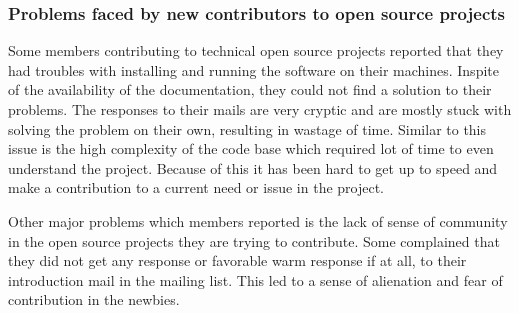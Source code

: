 \subsubsection {\bold Problems faced by new contributors to open source projects }


\newline
Some members contributing to technical open source projects reported that they had troubles with installing and running the software on their machines. Inspite of the availability of the documentation, they could not find a solution to their problems. The responses to their mails are very cryptic and are mostly stuck with solving the problem on their own, resulting in wastage of time. Similar to this issue is the high complexity of the code base which required lot of time to even understand the project. Because of this it has been hard to get up to speed and make a contribution to a current need or issue in the project.

\newline
Other major problems which members reported is the lack of sense of community in the open source projects they are trying to contribute. Some complained that they did not get any response or favorable warm response if at all, to their introduction mail in the mailing list. This led to a sense of alienation and fear of contribution in the newbies. 

